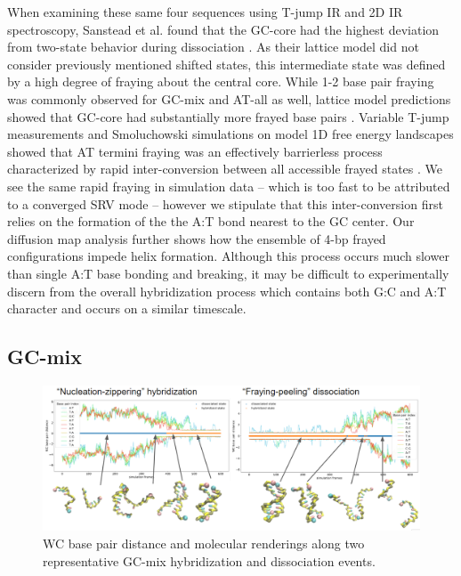\documentclass[journal=jpcbfk,manuscript=article]{achemso}
\begin{document}
When examining these same four sequences using T-jump IR and 2D IR spectroscopy, Sanstead et al. found that the GC-core had the highest deviation from two-state behavior during dissociation \citep{Sanstead2016}. As their lattice model did not consider previously mentioned shifted states, this intermediate state was defined by a high degree of fraying about the central core. While 1-2 base pair fraying was commonly observed for GC-mix and AT-all as well, lattice model predictions showed that GC-core had substantially more frayed base pairs \citep{Phys2019}. Variable T-jump measurements and Smoluchowski simulations on model 1D free energy landscapes showed that AT termini fraying was an effectively barrierless process characterized by rapid inter-conversion between all accessible frayed states \citep{Sanstead2018DirectDehybridization}. We see the same rapid fraying in simulation data -- which is too fast to be attributed to a converged SRV mode -- however we stipulate that this inter-conversion first relies on the formation of the the A:T bond nearest to the GC center. Our diffusion map analysis further shows how the ensemble of 4-bp frayed configurations impede helix formation. Although this process occurs much slower than single A:T base bonding and breaking, it may be difficult to experimentally discern from the overall hybridization process which contains both G:C and A:T character and occurs on a similar timescale.


\subsection{\label{sec:Results}GC-mix}

\begin{figure} %
	\begin{center}
        \includegraphics[width=\textwidth]{Figs/figs_0804/GC-mix_transitions.PNG}
        \caption{WC base pair distance and molecular renderings along two representative GC-mix hybridization and dissociation events.}
        \label{fig:GC-mix_transitions}
	\end{center}
\end{figure}
\end{document}
